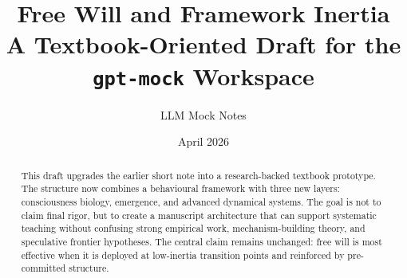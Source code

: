 


\hypersetup{pageanchor=false}

\title{\textbf{Free Will and Framework Inertia}\\[6pt]
       \large A Textbook-Oriented Draft for the \texttt{gpt-mock} Workspace}
\author{LLM Mock Notes}
\date{April 2026}
\maketitle

\begin{abstract}
This draft upgrades the earlier short note into a research-backed textbook
prototype. The structure now combines a behavioural framework with three new
layers: consciousness biology, emergence, and advanced dynamical systems.
The goal is not to claim final rigor, but to create a manuscript architecture
that can support systematic teaching without confusing strong empirical work,
mechanism-building theory, and speculative frontier hypotheses. The central
claim remains unchanged: free will is most effective when it is deployed at
low-inertia transition points and reinforced by pre-committed structure.
\end{abstract}

\tableofcontents
\clearpage
\hypersetup{pageanchor=true}












\appendix




